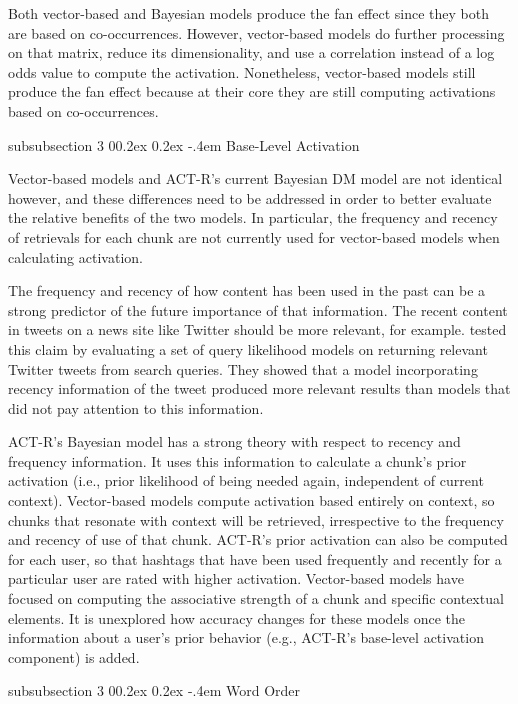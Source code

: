 \documentclass[man,floatsintext,donotrepeattitle]{apa6}
\makeatletter
\renewcommand{\subsubsection}{%
  \@startsection
  {subsubsection}%
  {3}%
  {\parindent}%
  {0\baselineskip \@plus 0.2ex \@minus 0.2ex}%
  {-.4em}%
  {\normalfont\normalsize\bfseries\addperi}}
\makeatother
\begin{document}
Both vector-based and Bayesian models produce the fan effect since they both are based on co-occurrences.
However, vector-based models do further processing on that matrix, reduce its dimensionality, and use a correlation instead of a log odds value to compute the activation.
Nonetheless, vector-based models still produce the fan effect because at their core they are still computing activations based on co-occurrences.

\subsubsection{Base-Level Activation}

Vector-based models and ACT-R's current Bayesian DM model are not identical however, and these differences need to be addressed in order to better evaluate the relative benefits of the two models. 
In particular, the frequency and recency of retrievals for each chunk are not currently used for vector-based models when calculating activation.

The frequency and recency of how content has been used in the past can be a strong predictor of the future importance of that information. 
The recent content in tweets on a news site like Twitter should be more relevant, for example.
\textcite{Efron2011} tested this claim by evaluating a set of query likelihood models on returning relevant Twitter tweets from search queries.
They showed that a model incorporating recency information of the tweet produced more relevant results than models that did not pay attention to this information.

ACT-R's Bayesian model has a strong theory with respect to recency and frequency information.
It uses this information to calculate a chunk's prior activation (i.e., prior likelihood of being needed again, independent of current context).
Vector-based models compute activation based entirely on context, so chunks that resonate with context will be retrieved, irrespective to the frequency and recency of use of that chunk.
ACT-R's prior activation can also be computed for each user, so that hashtags that have been used frequently and recently for a particular user are rated with higher activation.
Vector-based models have focused on computing the associative strength of a chunk and specific contextual elements.
It is unexplored how accuracy changes for these models once the information about a user's prior behavior (e.g., ACT-R's base-level activation component) is added.

\subsubsection{Word Order}
\end{document}

